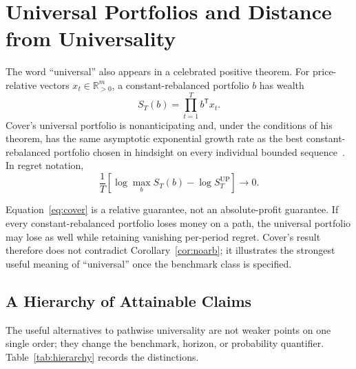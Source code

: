 \documentclass[aps,pra,reprint,superscriptaddress,amsmath,amssymb,floatfix]{revtex4-2}
\theoremstyle{plain}
\theoremstyle{definition}
\theoremstyle{remark}
\begin{document}
\section{Universal Portfolios and Distance from Universality}
\label{sec:cover}

The word ``universal'' also appears in a celebrated positive theorem.
For price-relative vectors \(x_t\in\mathbb{R}_{>0}^m\), a constant-rebalanced
portfolio \(b\) has wealth
\[
  S_T(b)=\prod_{t=1}^T b^\mathsf{T}x_t.
\]
Cover's universal portfolio is nonanticipating and, under the conditions of
his theorem, has the same asymptotic exponential growth rate as the best
constant-rebalanced portfolio chosen in hindsight on every individual bounded
sequence~\cite{Cover1991}. In regret notation,
\begin{equation}
  \frac1T\left[
  \log\max_{b}S_T(b)-\log S_T^{\mathrm{UP}}
  \right]\longrightarrow0.
  \label{eq:cover}
\end{equation}

Equation~\eqref{eq:cover} is a relative guarantee, not an absolute-profit
guarantee. If every constant-rebalanced portfolio loses money on a path, the
universal portfolio may lose as well while retaining vanishing per-period
regret. Cover's result therefore does not contradict
Corollary~\ref{cor:noarb}; it illustrates the strongest useful meaning of
``universal'' once the benchmark class is specified.

\subsection{A Hierarchy of Attainable Claims}

The useful alternatives to pathwise universality are not weaker points on one
single order; they change the benchmark, horizon, or probability quantifier.
Table~\ref{tab:hierarchy} records the distinctions.
\end{document}
